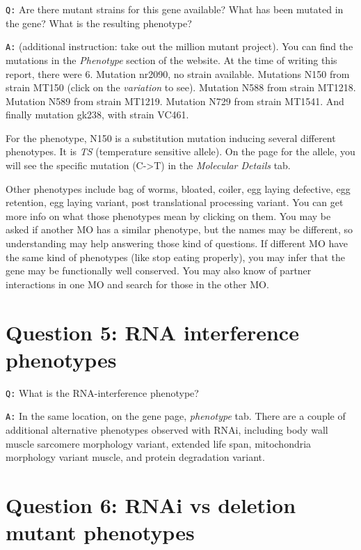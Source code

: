\documentclass[11pt, a4paper,titlepage]{article}
\begin{document}
\texttt{Q:} Are there mutant strains for this gene available? What has
been mutated in the gene? What is the resulting phenotype?
\smallskip

\noindent\texttt{A:} (additional instruction: take out the million
mutant project). You can find the mutations in the \emph{Phenotype}
section of the website. At the time of writing this report, there were
6. Mutation nr2090, no strain available. Mutations N150 from strain
MT150 (click on the \emph{variation} to see). Mutation N588 from
strain MT1218. Mutation N589 from strain MT1219. Mutation N729 from
strain MT1541. And finally mutation gk238, with strain VC461.

For the phenotype, N150 is a substitution mutation inducing several
different phenotypes. It is \emph{TS} (temperature sensitive
allele). On the page for the allele, you will see the specific
mutation (C->T) in the \emph{Molecular Details} tab.

Other phenotypes include bag of worms, bloated, coiler, egg laying
defective, egg retention, egg laying variant, post translational
processing variant. You can get more info on what those phenotypes
mean by clicking on them. You may be asked if another MO has a similar
phenotype, but the names may be different, so understanding may help
answering those kind of questions. If different MO have the same kind
of phenotypes (like stop eating properly), you may infer that the gene
may be functionally well conserved. You may also know of partner
interactions in one MO and search for those in the other MO.

\section*{Question 5: RNA interference phenotypes}

\texttt{Q:} What is the RNA-interference phenotype?
\smallskip

\noindent\texttt{A:} In the same location, on the gene page,
\emph{phenotype} tab. There are a couple of additional alternative
phenotypes observed with RNAi, including body wall muscle sarcomere
morphology variant, extended life span, mitochondria morphology
variant muscle, and protein degradation variant.

\section*{Question 6: RNAi vs deletion mutant phenotypes}
\end{document}
